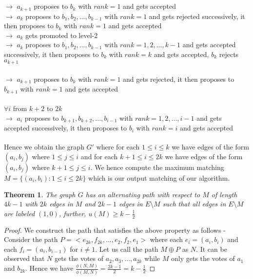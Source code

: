 \documentclass[a4paper,10pt]{article}
\theoremstyle{plain} %
\newtheorem{theorem}{Theorem}[section] %
\theoremstyle{plain} %
\begin{document}
\\
\\ $\rightarrow$ $a_{k+1}$ proposes to $b_{k}$ with $rank = 1$ and gets accepted
\\ $\rightarrow$ $a_{k}$ proposes to $b_{1}, b_{2}, ..., b_{k-1}$ with $rank = 1$ and gets rejected successively, it then proposes to $b_{k}$ with $rank = 1$ and gets accepted
\\ $\rightarrow$ $a_{k}$ gets promoted to level-2
\\ $\rightarrow$ $a_{k}$ proposes to $b_{1}, b_{2}, ..., b_{k-1}$ with $rank = 1, 2, ..., k-1$ and gets accepted successively, it then proposes to $b_{k}$ with $rank = k$ and gets accepted, $b_k$ rejects $a_{k+1}$
\\
\\ $\rightarrow$ $a_{k+1}$ proposes to $b_{k}$ with $rank = 1$ and gets rejected, it then proposes to $b_{k+1}$ with $rank = 1$ and gets accepted
\\
\\ $\forall i$ from $k+2$ to $2k$
\\ $\rightarrow$ $a_{i}$ proposes to $b_{k+1}, b_{k+2}, ..., b_{i-1}$ with $rank = 1, 2, ..., i-1$ and gets accepted successively, it then proposes to $b_{i}$ with $rank = i$ and gets accepted
\\ \\
Hence we obtain the graph $G'$ where for each $1 \leq i \leq k$ we have edges of the form $(a_i, b_j)$ where $1 \leq j \leq i$ and for each $k + 1 \leq i \leq 2k$ we have edges of the form $(a_i, b_j)$ where $k + 1 \leq j \leq i$. We hence compute the maximum matching $M = \{(a_i, b_i): 1 \leq i \leq 2k\}$ which is our output matching of our algorithm.

\begin{theorem}
    The graph $G$ has an alternating path with respect to $M$ of length $4k - 1$ with $2k$ edges in $M$ and $2k-1$ edges in $E \setminus M$ such that all edges in $E \setminus M$ are labeled $(1, 0)$, further, $u(M) \geq k - \frac{1}{2}$
\end{theorem}

\begin{proof}
    We construct the path that satisfies the above property as follows - 
    Consider the path $P = <e_{2k}, f_{2k}, ..., e_{2}, f_{2}, e_1>$ where each $e_i = (a_i, b_i)$ and each $f_i = (a_i, b_{i-1})$ for $i \neq 1$. Let us call the path $M \oplus P$ as $N$. It can be observed that $N$ gets the votes of $a_2, a_3, ..., a_{2k}$ while $M$ only gets the votes of $a_1$ and $b_{2k}$. Hence we have $\frac{\phi(N, M)}{\phi(M, N)} = \frac{2k-1}{2} = k - \frac{1}{2}$
\end{proof}
\end{document}
